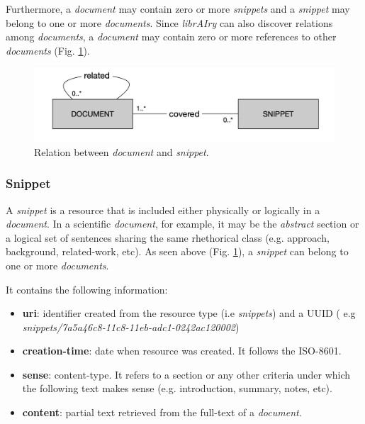 Furthermore, a \textit{document} may contain zero or more \textit{snippets} and a \textit{snippet} may belong to one or more \textit{documents}. Since \textit{librAIry} can also discover relations among \textit{documents}, a \textit{document} may contain zero or more references to other \textit{documents} (Fig. \ref{fig:librairy-model-document}).

\begin{figure}
  \center
  \includegraphics[scale=0.45]{model-document.png}
  \caption{Relation between \textit{document} and \textit{snippet}.}
  \label{fig:librairy-model-document}
\end{figure}

\subsubsection{Snippet}

A \textit{snippet} is a resource that is included either physically or logically in a \textit{document}. In a scientific \textit{document}, for example, it may be the \textit{abstract} section or a logical set of sentences sharing the same rhethorical class (e.g. approach, background, related-work, etc). As seen above (Fig. \ref{fig:librairy-model-document}), a \textit{snippet} can belong to one or more \textit{documents}.

It contains the following information:
\begin{itemize}
\item \textbf{uri}: identifier created from the resource type (i.e \textit{snippets}) and a UUID ( e.g \textit{snippets/7a5a46c8-11c8-11eb-adc1-0242ac120002})
\item \textbf{creation-time}: date when resource was created. It follows the ISO-8601.
\item \textbf{sense}: content-type. It refers to a section or any other criteria under which the following text makes sense (e.g. introduction, summary, notes, etc).
\item \textbf{content}: partial text retrieved from the full-text of a \textit{document}.
\end{itemize}


